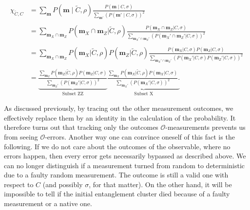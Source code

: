 \begin{align}
      \label{eq:lxe-subset-err}
      \chi_{\tilde{C},C} &= \sum_{\mathbf{m}} P(\mathbf{m} \mid \tilde{C}, \rho) \frac{P(\mathbf{m} \mid
      C, \sigma)}{\sum_{\mathbf{m}'}\left(P(\mathbf{m}' \mid
      C, \sigma)\right)^2} \nonumber\\
      \nonumber\\
      &= \sum_{\mathbf{m}_X \cap \mathbf{m}_Z} P(\mathbf{m}_X \cap \mathbf{m}_Z |
        \tilde{C}, \rho) \frac{P(\mathbf{m}_X \cap \mathbf{m}_Z| C,
        \sigma)}{\sum_{\mathbf{m}_X' \cap \mathbf{m}_Z'} \left(P(\mathbf{m}_X' \cap
        \mathbf{m}_Z'|C,\sigma)\right)^2}\nonumber\\
        \nonumber\\
      &= \sum_{\mathbf{m}_X \cap \mathbf{m}_Z} P(\mathbf{m}_X | \tilde{C}, \rho) P(
        \mathbf{m}_Z | \tilde{C}, \rho) \frac{P(\mathbf{m}_X | C, \sigma) P( \mathbf{m}_Z|
        C, \sigma)}{\sum_{\mathbf{m}_X' \cap \mathbf{m}_Z'}
          \left(P(\mathbf{m}_X' | C,
        \sigma) P( \mathbf{m}_Z'|C,\sigma)\right)^2}\nonumber\\
        \nonumber\\
      &= \underbrace{\frac{\sum_{\mathbf{m}_Z} P(\mathbf{m}_Z | \tilde{C}, \rho)
          P(\mathbf{m}_Z | C, \sigma)}{\sum_{\mathbf{m}_Z'}
          \left(P(\mathbf{m}_Z' |
          C, \sigma)\right)^2}}_{\text{Subset ZZ}}
          \underbrace{\frac{\sum_{\mathbf{m}_X} P(\mathbf{m}_X | \tilde{C}, \rho)
          P(\mathbf{m}_X | C, \sigma)}{\sum_{\mathbf{m}_X'}
          \left(P(\mathbf{m}_X' |
          C, \sigma)\right)^2}.}_{\text{Subset X}}
\end{align}

As discussed previously, by tracing out the other measurement outcomes, we
effectively replace them by an identity in the calculation of the probability.
It therefore turns out that tracking only the outcomes $\mathcal{O}$-measurements prevents us from
seeing $\mathcal{O}$-errors. Another way one can convince oneself of this fact
is the following.
If we do not care about the outcomes of the observable, where no errors
happen, then every error gets necessarily bypassed as described above. We can
no longer distinguish if a measurement turned from random to deterministic due
to a faulty random measurement. The outcome is still a valid one with respect to
$C$ (and possibly $\sigma$, for that matter). On the other hand, it will be
impossible to tell if the initial entanglement cluster died because of a faulty
measurement or a native one. 

